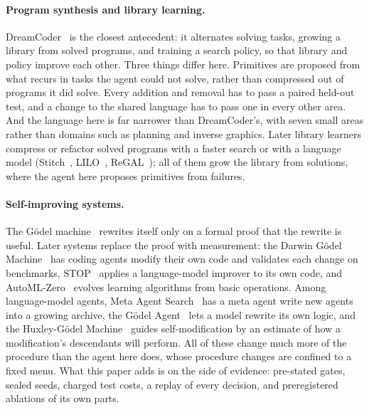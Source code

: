 \documentclass[11pt]{article}
\begin{document}
\paragraph{Program synthesis and library learning.} DreamCoder~\cite{ellis2021} is the closest antecedent: it alternates solving tasks, growing a library from solved programs, and training a search policy, so that library and policy improve each other. Three things differ here. Primitives are proposed from what recurs in tasks the agent could not solve, rather than compressed out of programs it did solve. Every addition and removal has to pass a paired held-out test, and a change to the shared language has to pass one in every other area. And the language here is far narrower than DreamCoder's, with seven small areas rather than domains such as planning and inverse graphics. Later library learners compress or refactor solved programs with a faster search or with a language model (Stitch~\cite{bowers2023}, LILO~\cite{grand2024}, ReGAL~\cite{stengel2024}); all of them grow the library from solutions, where the agent here proposes primitives from failures.

\paragraph{Self-improving systems.} The G\"odel machine~\cite{schmidhuber2007} rewrites itself only on a formal proof that the rewrite is useful. Later systems replace the proof with measurement: the Darwin G\"odel Machine~\cite{zhang2025} has coding agents modify their own code and validates each change on benchmarks, STOP~\cite{zelikman2023} applies a language-model improver to its own code, and AutoML-Zero~\cite{real2020} evolves learning algorithms from basic operations. Among language-model agents, Meta Agent Search~\cite{hu2025} has a meta agent write new agents into a growing archive, the G\"odel Agent~\cite{yin2025} lets a model rewrite its own logic, and the Huxley-G\"odel Machine~\cite{wang2025} guides self-modification by an estimate of how a modification's descendants will perform. All of these change much more of the procedure than the agent here does, whose procedure changes are confined to a fixed menu. What this paper adds is on the side of evidence: pre-stated gates, sealed seeds, charged test costs, a replay of every decision, and preregistered ablations of its own parts.
\end{document}
